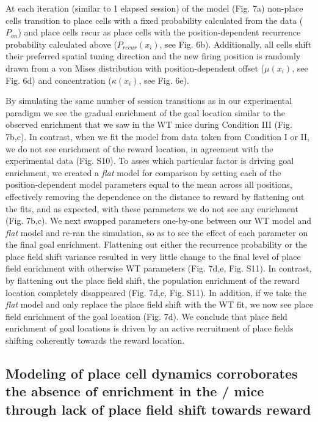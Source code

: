 At each iteration (similar to 1 elapsed session) of the model (Fig. 7a) non-place cells transition to place cells with a fixed probability calculated from the data ($P_{on}$) and place cells recur as place cells with the position-dependent recurrence probability calculated above ($P_{recur}(x_i)$, see Fig. 6b). Additionally, all cells shift their preferred spatial tuning direction and the new firing position is randomly drawn from a von Mises distribution with position-dependent offset ($\mu(x_i)$, see Fig. 6d) and concentration ($\kappa(x_i)$, see Fig. 6e).

By simulating the same number of session transitions as in our experimental paradigm we see the gradual enrichment of the goal location similar to the observed enrichment that we saw in the WT mice during Condition III (Fig. 7b,c).  In contrast, when we fit the model from data taken from Condition I or II, we do not see enrichment of the reward location, in agreement with the experimental data (Fig. S10). To asses which particular factor is driving goal enrichment, we created a \emph{flat} model for comparison by setting each of the position-dependent model parameters equal to the mean across all positions, effectively removing the dependence on the distance to reward by flattening out the fits, and as expected, with these parameters we do not see any enrichment (Fig. 7b,c). We next swapped parameters one-by-one between our WT model and \emph{flat} model and re-ran the simulation, so as to see the effect of each parameter on the final goal enrichment. Flattening out either the recurrence probability or the place field shift variance resulted in very little change to the final level of place field enrichment with otherwise WT parameters (Fig. 7d,e, Fig. S11). In contrast, by flattening out the place field shift, the population enrichment of the reward location completely disappeared (Fig. 7d,e, Fig. S11). In addition, if we take the \emph{flat} model and only replace the place field shift with the WT fit, we now see place field enrichment of the goal location (Fig. 7d). We conclude that place field enrichment of goal locations is driven by an active recruitment of place fields shifting coherently towards the reward location.

\subsection{Modeling of place cell dynamics corroborates the absence of enrichment in the \df/ mice through lack of place field shift towards reward}

